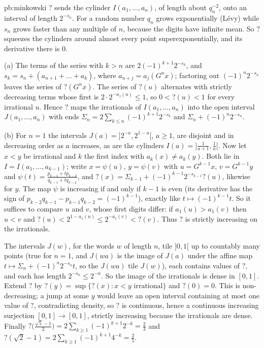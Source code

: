 \begin{solution}{pb:minkowski}
\idea $?$ sends the cylinder $I(a_1,\dots,a_n)$, of length about $q_n^{-2}$, onto an interval of length $2^{-s_n}$. For a random number $q_n$ grows exponentially
(Lévy) while $s_n$ grows faster than any multiple of $n$, because the digits have infinite mean. So $?$ squeezes the cylinders around almost every point
superexponentially, and its derivative there is $0$.

\writeup (a) The terms of the series with $k>n$ are $2(-1)^{k+1}2^{-s_k}$, and $s_k=s_n+(a_{n+1}+\dots+a_k)$, where $a_{n+j}=a_j(G^nx)$; factoring out
$(-1)^n2^{-s_n}$ leaves the series of $?(G^nx)$. The series of $?(u)$ alternates with strictly decreasing terms whose first is $2\cdot2^{-a_1(u)}\le1$, so
$0<?(u)<1$ for every irrational $u$. Hence $?$ maps the irrationals of $I(a_1,\dots,a_n)$ into the open interval $J(a_1,\dots,a_n)$ with ends
$\Sigma_n=2\sum_{k\le n}(-1)^{k+1}2^{-s_k}$ and $\Sigma_n+(-1)^n2^{-s_n}$.

(b) For $n=1$ the intervals $J(a)=]2^{-a},2^{1-a}[$, $a\ge1$, are disjoint and in decreasing order as $a$ increases, as are the cylinders $I(a)=]\frac1{a+1},\frac1a[$.
Now let $x<y$ be irrational and $k$ the first index with $a_k(x)\ne a_k(y)$. Both lie in $I=I(a_1,\dots,a_{k-1})$; write $x=\psi(u)$, $y=\psi(v)$ with $u=G^{k-1}x$,
$v=G^{k-1}y$ and $\psi(t)=\frac{p_{k-1}+tp_{k-2}}{q_{k-1}+tq_{k-2}}$, and $?(x)=\Sigma_{k-1}+(-1)^{k-1}2^{-s_{k-1}}?(u)$, likewise for $y$. The map $\psi$ is increasing
if and only if $k-1$ is even (its derivative has the sign of $p_{k-2}q_{k-1}-p_{k-1}q_{k-2}=(-1)^{k-1}$), exactly like $t\mapsto(-1)^{k-1}t$. So it suffices to compare
$u$ and $v$, whose first digits differ: if $a_1(u)>a_1(v)$ then $u<v$ and $?(u)<2^{1-a_1(u)}\le2^{-a_1(v)}<?(v)$. Thus $?$ is strictly increasing on the irrationals.

The intervals $J(w)$, for the words $w$ of length $n$, tile $]0,1[$ up to countably many points (true for $n=1$, and $J(wa)$ is the image of $J(a)$ under the affine map
$t\mapsto\Sigma_n+(-1)^n2^{-s_n}t$, so the $J(wa)$ tile $J(w)$), each contains values of $?$, and each has length $2^{-s_n}\le2^{-n}$. So the image of the irrationals is
dense in $[0,1]$. Extend $?$ by $?(y)=\sup\{?(x):x<y\text{ irrational}\}$ and $?(0)=0$. This is non-decreasing; a jump at some $y$ would leave an open interval containing at
most one value of $?$, contradicting density, so $?$ is continuous, hence a continuous increasing surjection $[0,1]\to[0,1]$, strictly increasing because the
irrationals are dense. Finally $?\bigl(\frac{\sqrt5-1}2\bigr)=2\sum_{k\ge1}(-1)^{k+1}2^{-k}=\frac23$ and $?(\sqrt2-1)=2\sum_{k\ge1}(-1)^{k+1}4^{-k}=\frac25$.


\end{solution}
